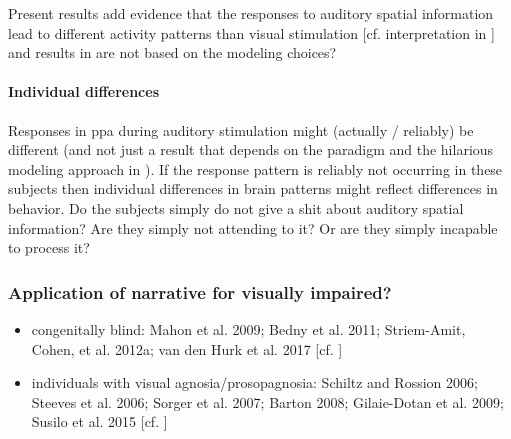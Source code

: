 
%
Present results add evidence that the responses to auditory spatial information
lead to different activity patterns than visual stimulation [cf. interpretation
in \citet{haeusler2022processing}] and results in \citet{haeusler2022processing}
are not based on the modeling choices?



\paragraph{Individual differences}


%
Responses in \ac{ppa} during auditory stimulation might (actually / reliably) be
different (and not just a result that depends on the paradigm and the hilarious
modeling approach in \citet{haeusler2022processing}).
%
If the response pattern is reliably not occurring in these subjects then
individual differences in brain patterns might reflect differences in behavior.
%
Do the subjects simply do not give a shit about auditory spatial information?
%
Are they simply not attending to it? Or are they simply incapable to process it?


\subsubsection{Application of narrative for visually impaired?}



\begin{itemize}

\item congenitally blind:
    Mahon et al. 2009;
    Bedny et al. 2011;
    Striem-Amit, Cohen, et al. 2012a;
    van den Hurk et al. 2017
    [cf. \citet{rosenke2021probabilistic}]

\item individuals with visual agnosia/prosopagnosia:
    Schiltz and Rossion 2006;
    Steeves et al. 2006;
    Sorger et al. 2007;
    Barton 2008;
    Gilaie-Dotan et al. 2009;
    Susilo et al. 2015
    [cf. \citet{rosenke2021probabilistic}]

\end{itemize}

